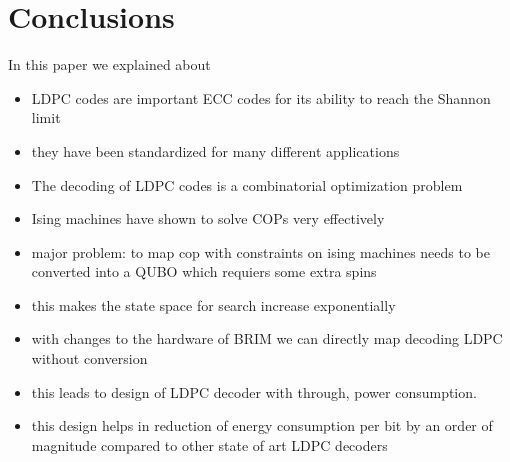 \section{Conclusions}\label{sec:conclusion}

In this paper we explained about

\begin{itemize}
    \item  LDPC codes are important ECC codes for its ability to reach the Shannon limit
    \item they have been standardized for many different applications
    \item The decoding of LDPC codes is a combinatorial optimization problem
    \item Ising machines have shown to solve COPs very effectively
    \item major problem: to map cop with constraints on ising machines needs to be converted into a QUBO which requiers some extra spins
    \item this makes the state space for search increase exponentially
    \item with changes to the hardware of BRIM we can directly map decoding LDPC without conversion
    \item this leads to design of LDPC decoder with  through,  power consumption.
    \item this design helps in reduction of energy consumption per bit by an order of magnitude compared to other state of art LDPC decoders
    
\end{itemize}